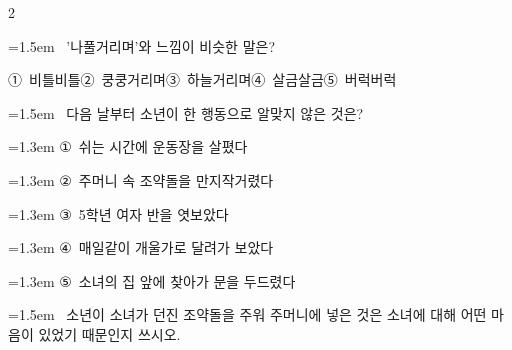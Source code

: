 \documentclass[11pt, a4paper]{article}
\begin{document}
\begin{multicols}{2}
\noindent\begin{minipage}{\columnwidth}
\vspace{2mm}
{\hangindent=1.5em  ~'나풀거리며'와 느낌이 비슷한 말은?\par}

\vspace{0.5mm}
\noindent
\mbox{①~비틀비틀}\hspace{1em}\mbox{②~쿵쿵거리며}\hspace{1em}\mbox{③~하늘거리며}\hspace{1em}\mbox{④~살금살금}\hspace{1em}\mbox{⑤~버럭버럭}

\vspace{4mm}
\end{minipage}
\par

\noindent\begin{minipage}{\columnwidth}
\vspace{2mm}
{\hangindent=1.5em  ~다음 날부터 소년이 한 행동으로 알맞지 않은 것은?\par}

\vspace{0.5mm}
{\hangindent=1.3em  \noindent\hspace{0.3em}①~쉬는 시간에 운동장을 살폈다\par}
{\hangindent=1.3em  \noindent\hspace{0.3em}②~주머니 속 조약돌을 만지작거렸다\par}
{\hangindent=1.3em  \noindent\hspace{0.3em}③~5학년 여자 반을 엿보았다\par}
{\hangindent=1.3em  \noindent\hspace{0.3em}④~매일같이 개울가로 달려가 보았다\par}
{\hangindent=1.3em  \noindent\hspace{0.3em}⑤~소녀의 집 앞에 찾아가 문을 두드렸다\par}
\vspace{4mm}
\end{minipage}
\par

\noindent\begin{minipage}{\columnwidth}
\vspace{2mm}
{\hangindent=1.5em  ~소년이 소녀가 던진 조약돌을 주워 주머니에 넣은 것은 소녀에 대해 어떤 마음이 있었기 때문인지 쓰시오.\par}


\end{minipage}
\end{multicols}
\end{document}

